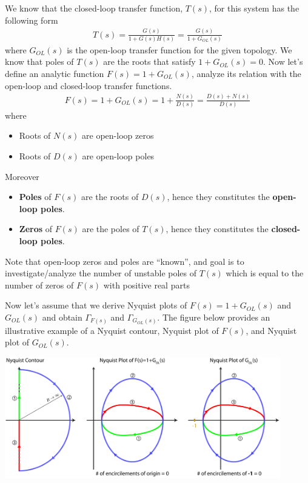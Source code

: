 \documentclass[twoside]{article}
\begin{document}
We know that the closed-loop transfer function, $T(s)$, for this
system has the following form
%
\begin{align*}
  T(s) = \frac{G(s)}{1 + G(s) H(s)} = \frac{G(s)}{1 + G_{OL}(s)}  
\end{align*}
%
where $G_{OL}(s)$ is the open-loop transfer function for the given
topology. We know that poles of $T(s)$ are the roots that satisfy 
$1 + G_{OL}(s) = 0$. Now let's define an analytic function $F(s) = 1 +
G_{OL}(s)$, analyze its relation with the open-loop and closed-loop
transfer functions. 
%
\begin{align*}
  F(s) = 1 + G_{OL}(s) = 1 + \frac{ N(s) }{ D(s) } = \frac{ D(s) + N(s) }{D(s)}
\end{align*}
%
where 
\begin{itemize}
  \item Roots of $N(s)$ are open-loop zeros
  \item Roots of $D(s)$ are open-loop poles
\end{itemize}
%
Moreover 
\begin{itemize}
  \item \textbf{Poles} of $F(s)$ are the roots of $D(s)$, hence they
    constitutes the \textbf{open-loop poles}.
  \item \textbf{Zeros} of $F(s)$ are the poles of $T(s)$, hence 
    they constitutes the \textbf{closed-loop poles}.
\end{itemize}
%
Note that open-loop zeros and poles are ``known'', and goal is 
to investigate/analyze the number of unstable poles of $T(s)$
which is equal to the number of zeros of $F(s)$ with positive real parts

Now let's assume that we derive Nyquist plots of $F(s) = 1 +
G_{OL}(s)$ and $G_{OL}(s)$ and obtain $\Gamma_{F(s)}$ and
$\Gamma_{G_{OL}(s)}$. The figure below provides an illustrative
example of a Nyquist contour, Nyquist plot of $F(s)$, and
Nyquist plot of $G_{OL}(s)$. 

\vspace{6 pt}

  \begin{minipage}[h]{1\linewidth}
    \begin{center}
      \includegraphics[width=0.9\textwidth]{nyq}
    \end{center}
  \end{minipage}
\end{document}

